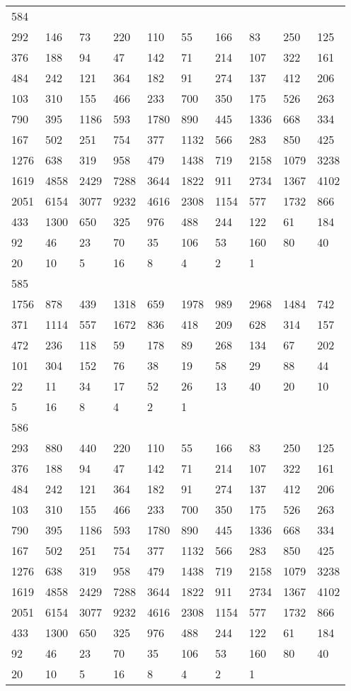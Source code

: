 \begin{longtable}{*{10}{l}}
584&&&&&&&&&\\
292& 146& 73& 220& 110& 55& 166& 83& 250& 125\\
376& 188& 94& 47& 142& 71& 214& 107& 322& 161\\
484& 242& 121& 364& 182& 91& 274& 137& 412& 206\\
103& 310& 155& 466& 233& 700& 350& 175& 526& 263\\
790& 395& 1186& 593& 1780& 890& 445& 1336& 668& 334\\
167& 502& 251& 754& 377& 1132& 566& 283& 850& 425\\
1276& 638& 319& 958& 479& 1438& 719& 2158& 1079& 3238\\
1619& 4858& 2429& 7288& 3644& 1822& 911& 2734& 1367& 4102\\
2051& 6154& 3077& 9232& 4616& 2308& 1154& 577& 1732& 866\\
433& 1300& 650& 325& 976& 488& 244& 122& 61& 184\\
92& 46& 23& 70& 35& 106& 53& 160& 80& 40\\
20& 10& 5& 16& 8& 4& 2& 1& \\

585&&&&&&&&&\\
1756& 878& 439& 1318& 659& 1978& 989& 2968& 1484& 742\\
371& 1114& 557& 1672& 836& 418& 209& 628& 314& 157\\
472& 236& 118& 59& 178& 89& 268& 134& 67& 202\\
101& 304& 152& 76& 38& 19& 58& 29& 88& 44\\
22& 11& 34& 17& 52& 26& 13& 40& 20& 10\\
5& 16& 8& 4& 2& 1& \\

586&&&&&&&&&\\
293& 880& 440& 220& 110& 55& 166& 83& 250& 125\\
376& 188& 94& 47& 142& 71& 214& 107& 322& 161\\
484& 242& 121& 364& 182& 91& 274& 137& 412& 206\\
103& 310& 155& 466& 233& 700& 350& 175& 526& 263\\
790& 395& 1186& 593& 1780& 890& 445& 1336& 668& 334\\
167& 502& 251& 754& 377& 1132& 566& 283& 850& 425\\
1276& 638& 319& 958& 479& 1438& 719& 2158& 1079& 3238\\
1619& 4858& 2429& 7288& 3644& 1822& 911& 2734& 1367& 4102\\
2051& 6154& 3077& 9232& 4616& 2308& 1154& 577& 1732& 866\\
433& 1300& 650& 325& 976& 488& 244& 122& 61& 184\\
92& 46& 23& 70& 35& 106& 53& 160& 80& 40\\
20& 10& 5& 16& 8& 4& 2& 1& \\


\end{longtable}
